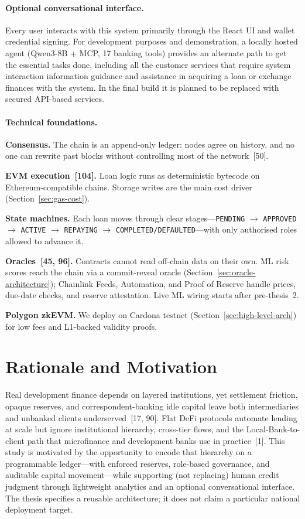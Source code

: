 \documentclass[12pt,a4paper]{report}
\begin{document}
\paragraph{Optional conversational interface.}
Every user interacts with this system primarily through the React UI and wallet credential signing. For development purposes and demonstration, a locally hosted agent (Qwen3-8B + MCP, 17 banking tools) provides an alternate path to get the essential tasks done, including all the customer services that require system interaction information guidance and assistance in acquiring a loan or exchange finances with the system. In the final build it is planned to be replaced with secured API-based services.

\paragraph{Technical foundations.}
\label{sec:blockchain-fundamentals}

\textbf{Consensus.} The chain is an append-only ledger: nodes agree on history, and no one can rewrite past blocks without controlling most of the network~[50].

\textbf{EVM execution~[104].} Loan logic runs as deterministic bytecode on Ethereum-compatible chains. Storage writes are the main cost driver (Section~\ref{sec:gas-cost}).

\textbf{State machines.} Each loan moves through clear stages---\texttt{PENDING} $\to$ \texttt{APPROVED} $\to$ \texttt{ACTIVE} $\to$ \texttt{REPAYING} $\to$ \texttt{COMPLETED/DEFAULTED}---with only authorised roles allowed to advance it.

\textbf{Oracles~[45, 96].} Contracts cannot read off-chain data on their own. ML risk scores reach the chain via a commit-reveal oracle (Section~\ref{sec:oracle-architecture}); Chainlink Feeds, Automation, and Proof of Reserve handle prices, due-date checks, and reserve attestation. Live ML wiring starts after pre-thesis~2.

\textbf{Polygon zkEVM.} We deploy on Cardona testnet (Section~\ref{sec:high-level-arch}) for low fees and L1-backed validity proofs.

\section{Rationale and Motivation}
\label{sec:rationale}

Real development finance depends on layered institutions, yet settlement friction, opaque reserves, and correspondent-banking idle capital leave both intermediaries and unbanked clients underserved~[17, 90]. Flat DeFi protocols automate lending at scale but ignore institutional hierarchy, cross-tier flows, and the Local-Bank-to-client path that microfinance and development banks use in practice~[1]. This study is motivated by the opportunity to encode that hierarchy on a programmable ledger---with enforced reserves, role-based governance, and auditable capital movement---while supporting (not replacing) human credit judgment through lightweight analytics and an optional conversational interface. The thesis specifies a reusable architecture; it does not claim a particular national deployment target.
\end{document}
